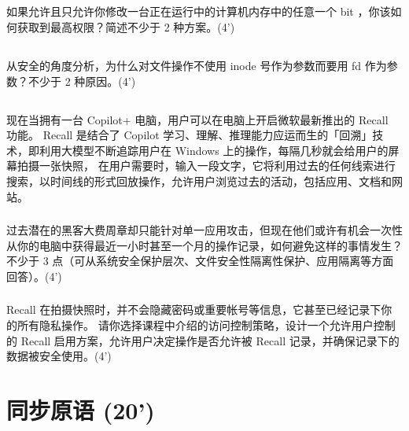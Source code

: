 \documentclass[a4paper,12pt]{article}
\newcommand{\score}[1]{(#1')}
\begin{document}
\subsection{}

如果允许且只允许你修改一台正在运行中的计算机内存中的任意一个 bit ，你该如何获取到最高权限？简述不少于 2 种方案。\score{4}

\subsection{}

从安全的角度分析，为什么对文件操作不使用 inode 号作为参数而要用 fd 作为参数？不少于 2 种原因。\score{4}

\subsection{}

现在当拥有一台 Copilot+ 电脑，用户可以在电脑上开启微软最新推出的 Recall 功能。
Recall 是结合了 Copilot 学习、理解、推理能力应运而生的「回溯」技术，即利用大模型不断追踪用户在 Windows 上的操作，每隔几秒就会给用户的屏幕拍摄一张快照，
在用户需要时，输入一段文字，它将利用过去的任何线索进行搜索，以时间线的形式回放操作，允许用户浏览过去的活动，包括应用、文档和网站。

\subsubsection{}

过去潜在的黑客大费周章却只能针对单一应用攻击，但现在他们或许有机会一次性从你的电脑中获得最近一小时甚至一个月的操作记录，如何避免这样的事情发生？
不少于 3 点（可从系统安全保护层次、文件安全性隔离性保护、应用隔离等方面回答）。\score{4}

\subsubsection{}

Recall 在拍摄快照时，并不会隐藏密码或重要帐号等信息，它甚至已经记录下你的所有隐私操作。
请你选择课程中介绍的访问控制策略，设计一个允许用户控制的 Recall 启用方案，允许用户决定操作是否允许被 Recall 记录，并确保记录下的数据被安全使用。\score{4}

\section{同步原语 \score{20}}

\subsection{}
\end{document}
